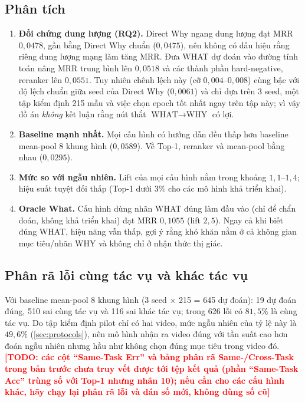 \documentclass[12pt,a4paper]{report}
\newcommand{\TODO}[1]{\textcolor{red}{\textbf{[TODO: #1]}}}
\begin{document}
\subsection{Phân tích}
\begin{enumerate}
    \item \textbf{Đối chứng dung lượng (RQ2).} Direct Why ngang dung lượng đạt MRR $0{,}0478$, gần bằng Direct Why chuẩn ($0{,}0475$), nên không có dấu hiệu rằng riêng dung lượng mạng làm tăng MRR. Đưa WHAT dự đoán vào đường tính toán nâng MRR trung bình lên $0{,}0518$ và các thành phần hard-negative, reranker lên $0{,}0551$. Tuy nhiên chênh lệch này (cỡ $0{,}004$--$0{,}008$) cùng bậc với độ lệch chuẩn giữa seed của Direct Why ($0{,}0061$) và chỉ dựa trên 3 seed, một tập kiểm định 215 mẫu và việc chọn epoch tốt nhất ngay trên tập này; vì vậy đồ án \emph{không} kết luận rằng nút thắt $\text{WHAT}\to\text{WHY}$ có lợi.
    \item \textbf{Baseline mạnh nhất.} Mọi cấu hình có hướng dẫn đều thấp hơn baseline mean-pool 8 khung hình ($0{,}0589$). Về Top-1, reranker và mean-pool bằng nhau ($0{,}0295$).
    \item \textbf{Mức so với ngẫu nhiên.} Lift của mọi cấu hình nằm trong khoảng $1{,}1$--$1{,}4$; hiệu suất tuyệt đối thấp (Top-1 dưới $3\%$ cho các mô hình khả triển khai).
    \item \textbf{Oracle What.} Cấu hình dùng nhãn WHAT đúng làm đầu vào (chỉ để chẩn đoán, không khả triển khai) đạt MRR $0{,}1055$ (lift $2{,}5$). Ngay cả khi biết đúng WHAT, hiệu năng vẫn thấp, gợi ý rằng khó khăn nằm ở cả không gian mục tiêu/nhãn WHY và không chỉ ở nhận thức thị giác.
\end{enumerate}

\subsection{Phân rã lỗi cùng tác vụ và khác tác vụ}

Với baseline mean-pool 8 khung hình (3 seed $\times$ 215 = 645 dự đoán): 19 dự đoán đúng, 510 sai cùng tác vụ và 116 sai khác tác vụ; trong 626 lỗi có $81{,}5\%$ là cùng tác vụ. Do tập kiểm định pilot chỉ có hai video, mức ngẫu nhiên của tỷ lệ này là $49{,}6\%$ (\cref{sec:protocols}), nên mô hình nhận ra video đúng với tần suất cao hơn đoán ngẫu nhiên nhưng hầu như không chọn đúng mục tiêu trong video đó. \TODO{các cột ``Same-Task Err'' và bảng phân rã Same-/Cross-Task trong bản trước chưa truy vết được tới tệp kết quả (phần ``Same-Task Acc'' trùng số với Top-1 nhưng nhân 10); nếu cần cho các cấu hình khác, hãy chạy lại phân rã lỗi và dán số mới, không dùng số cũ}
\end{document}
